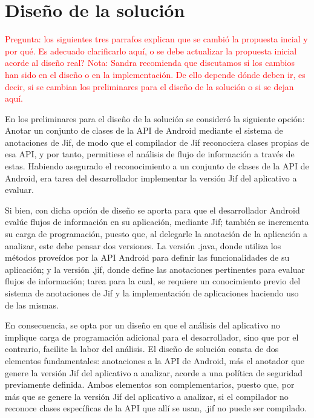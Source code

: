 
\section{Diseño de la solución}

\textcolor{red}
{Pregunta: los siguientes tres parrafos explican que se cambió la propuesta
incial y por qué. Es adecuado clarificarlo aquí, o se debe actualizar la
propuesta inicial acorde al diseño real? Nota: Sandra recomienda que discutamos
si los cambios han sido en el diseño o en la implementación. De ello depende
dónde deben ir, es decir, si se cambian los preliminares para el diseño de la
solución o si se dejan aquí.}

En los preliminares para el diseño de la solución se consideró la siguiente
opción: Anotar un conjunto de clases de la API de Android mediante el sistema de
anotaciones de Jif, de modo que el compilador de Jif reconociera clases propias
de esa API, y por tanto, permitiese el análisis de flujo de información a través
de estas. Habiendo asegurado el reconocimiento a un
conjunto de clases de la API de Android, era tarea del desarrollador implementar
la versión Jif del aplicativo a evaluar.

Si bien, con dicha opción de diseño se aporta para que el desarrollador
Android evalúe flujos de información en su aplicación, mediante Jif; también se
incrementa su carga de programación, puesto que, al delegarle la anotación de la
aplicación a analizar, este debe pensar dos versiones. La versión .java, donde
utiliza los métodos proveídos por la API Android para definir las
funcionalidades de su aplicación; y la versión .jif, donde define las anotaciones pertinentes para
evaluar flujos de información; tarea para la cual, se requiere un conocimiento
previo del sistema de anotaciones de Jif y la implementación de aplicaciones
haciendo uso de las mismas.

En consecuencia, se opta por un diseño en que el análisis del aplicativo no
implique carga de programación adicional para el desarrollador, sino que por el
contrario, facilite la labor del análisis.\newline 
El diseño de solución consta de dos elementos fundamentales: anotaciones a la
API de Android, más el anotador que genere la versión Jif del aplicativo a
analizar, acorde a una política de seguridad previamente definida.\newline
Ambos elementos son complementarios, puesto que, por más que se genere la
versión Jif del aplicativo a analizar, si el compilador no reconoce clases
específicas de la API que allí se usan, .jif no puede ser compilado.

